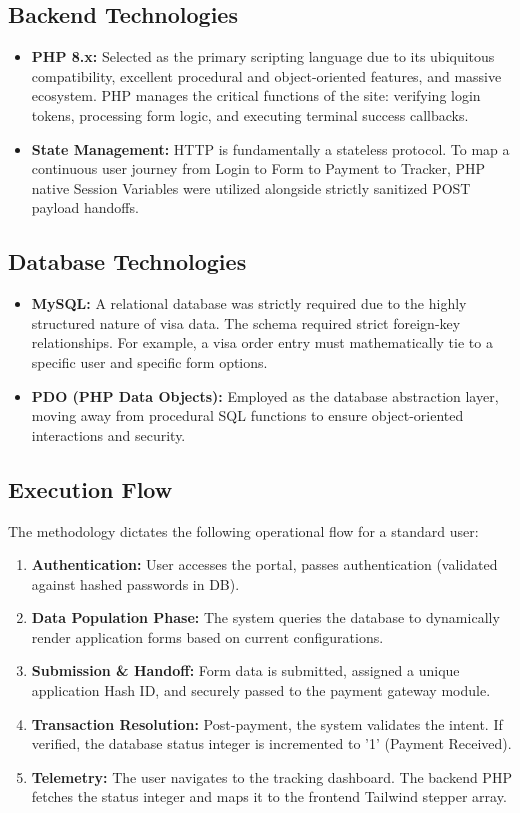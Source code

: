 \documentclass[12pt, a4paper]{article}
\begin{document}
\subsection{Backend Technologies}
\begin{itemize}
    \item \textbf{PHP 8.x:} Selected as the primary scripting language due to its ubiquitous compatibility, excellent procedural and object-oriented features, and massive ecosystem. PHP manages the critical functions of the site: verifying login tokens, processing form logic, and executing terminal success callbacks.
    \item \textbf{State Management:} HTTP is fundamentally a stateless protocol. To map a continuous user journey from Login to Form to Payment to Tracker, PHP native Session Variables were utilized alongside strictly sanitized POST payload handoffs.
\end{itemize}

\subsection{Database Technologies}
\begin{itemize}
    \item \textbf{MySQL:} A relational database was strictly required due to the highly structured nature of visa data. The schema required strict foreign-key relationships. For example, a visa order entry must mathematically tie to a specific user and specific form options.
    \item \textbf{PDO (PHP Data Objects):} Employed as the database abstraction layer, moving away from procedural SQL functions to ensure object-oriented interactions and security.
\end{itemize}

\subsection{Execution Flow}
The methodology dictates the following operational flow for a standard user:
\begin{enumerate}
    \item \textbf{Authentication:} User accesses the portal, passes authentication (validated against hashed passwords in DB).
    \item \textbf{Data Population Phase:} The system queries the database to dynamically render application forms based on current configurations.
    \item \textbf{Submission \& Handoff:} Form data is submitted, assigned a unique application Hash ID, and securely passed to the payment gateway module.
    \item \textbf{Transaction Resolution:} Post-payment, the system validates the intent. If verified, the database status integer is incremented to '1' (Payment Received).
    \item \textbf{Telemetry:} The user navigates to the tracking dashboard. The backend PHP fetches the status integer and maps it to the frontend Tailwind stepper array.
\end{enumerate}
\end{document}
